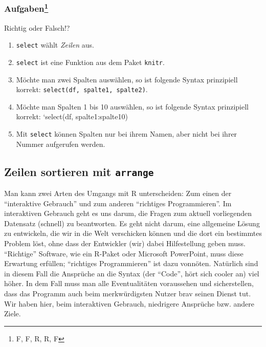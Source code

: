 \documentclass[12pt,ngerman,]{book}
\providecommand{\tightlist}{%
  \setlength{\itemsep}{0pt}\setlength{\parskip}{0pt}}
\let\rmarkdownfootnote\footnote%
\def\footnote{\protect\rmarkdownfootnote}
\theoremstyle{definition}
\theoremstyle{definition}
\theoremstyle{remark}
\let\BeginKnitrBlock\begin \let\EndKnitrBlock\end
\begin{document}
\subsubsection[Aufgaben]{\texorpdfstring{Aufgaben\footnote{F, F, R, R, F}}{Aufgaben}}\label{aufgaben-3}

\BeginKnitrBlock{rmdexercises}
Richtig oder Falsch!?

\begin{enumerate}
\def\labelenumi{\arabic{enumi}.}
\tightlist
\item
  \texttt{select} wählt \emph{Zeilen} aus.
\item
  \texttt{select} ist eine Funktion aus dem Paket \texttt{knitr}.
\item
  Möchte man zwei Spalten auswählen, so ist folgende Syntax prinzipiell
  korrekt: \texttt{select(df,\ spalte1,\ spalte2)}.
\item
  Möchte man Spalten 1 bis 10 auswählen, so ist folgende Syntax
  prinzipiell korrekt: `select(df, spalte1:spalte10)
\item
  Mit \texttt{select} können Spalten nur bei ihrem Namen, aber nicht bei
  ihrer Nummer aufgerufen werden.
\end{enumerate}
\EndKnitrBlock{rmdexercises}

\subsection{\texorpdfstring{Zeilen sortieren mit
\texttt{arrange}}{Zeilen sortieren mit arrange}}\label{zeilen-sortieren-mit-arrange}

Man kann zwei Arten des Umgangs mit R unterscheiden: Zum einen der
``interaktive Gebrauch'' und zum anderen ``richtiges Programmieren''. Im
interaktiven Gebrauch geht es uns darum, die Fragen zum aktuell
vorliegenden Datensatz (schnell) zu beantworten. Es geht nicht darum,
eine allgemeine Lösung zu entwickeln, die wir in die Welt verschicken
können und die dort ein bestimmtes Problem löst, ohne dass der
Entwickler (wir) dabei Hilfestellung geben muss. ``Richtige'' Software,
wie ein R-Paket oder Microsoft PowerPoint, muss diese Erwartung
erfüllen; ``richtiges Programmieren'' ist dazu vonnöten. Natürlich sind
in diesem Fall die Ansprüche an die Syntax (der ``Code'', hört sich
cooler an) viel höher. In dem Fall muss man alle Eventualitäten
voraussehen und sicherstellen, dass das Programm auch beim
merkwürdigsten Nutzer brav seinen Dienst tut. Wir haben hier, beim
interaktiven Gebrauch, niedrigere Ansprüche bzw. andere Ziele.
\end{document}
